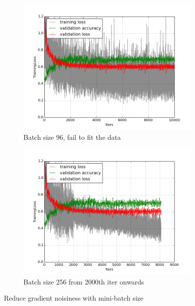 \documentclass[a4paper,11pt]{article}
\begin{document}
\begin{figure}
    \centering
    \begin{minipage}[b]{\textwidth}
      \begin{subfigure}{.5\textwidth} 
        \centering
        \includegraphics[scale=0.4]{images/plot_soil_contam_none_lr5_sbl.png}
        \caption{Batch size 96, fail to fit the data}\label{fig:2a}
      \end{subfigure}%
      \begin{subfigure}{.5\textwidth} 
        \centering
        \includegraphics[scale=0.4]{images/plot_soil_contam_none_bs256_lr5_sbl.png}
        \caption{Batch size 256 from 2000th iter onwards}\label{fig:2b}
      \end{subfigure} \par \vspace*{20pt} %
      \caption{Reduce gradient noisiness with mini-batch size}\label{fig:2}
    \end{minipage}%
    \label{f68}
\end{figure}
\end{document}
